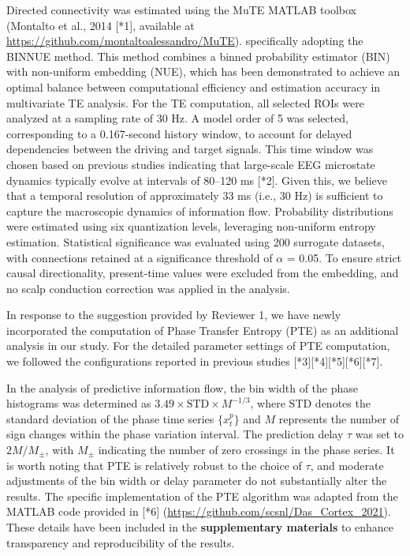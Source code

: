\documentclass[12pt,technote,onecolumn]{IEEEtran}
\begin{document}
Directed connectivity was estimated using the MuTE MATLAB toolbox (Montalto et al., 2014 [*1], available at \url{https://github.com/montaltoalessandro/MuTE}). specifically adopting the BINNUE method. This method combines a binned probability estimator (BIN) with non-uniform embedding (NUE), which has been demonstrated to achieve an optimal balance between computational efficiency and estimation accuracy in multivariate TE analysis. For the TE computation, all selected ROIs were analyzed at a sampling rate of 30 Hz. A model order of 5 was selected, corresponding to a 0.167-second history window, to account for delayed dependencies between the driving and target signals. This time window was chosen based on previous studies indicating that large-scale EEG microstate dynamics typically evolve at intervals of 80–120 ms [*2]. Given this, we believe that a temporal resolution of approximately 33 ms (i.e., 30 Hz) is sufficient to capture the macroscopic dynamics of information flow. Probability distributions were estimated using six quantization levels, leveraging non-uniform entropy estimation. Statistical significance was evaluated using 200 surrogate datasets, with connections retained at a significance threshold of  $\alpha$ = 0.05. To ensure strict causal directionality, present-time values were excluded from the embedding, and no scalp conduction correction was applied in the analysis.

In response to the suggestion provided by Reviewer 1, we have newly incorporated the computation of Phase Transfer Entropy (PTE) as an additional analysis in our study. For the detailed parameter settings of PTE computation, we followed the configurations reported in previous studies [*3][*4][*5][*6][*7]. 

In the analysis of predictive information flow, the bin width of the phase histograms was determined as $3.49 \times \mathrm{STD} \times M^{-1/3}$, where $\mathrm{STD}$ denotes the standard deviation of the phase time series $\{x_t^p\}$ and $M$ represents the number of sign changes within the phase variation interval. The prediction delay $\tau$ was set to $2M/M_\pm$, with $M_\pm$ indicating the number of zero crossings in the phase series. It is worth noting that PTE is relatively robust to the choice of $\tau$, and moderate adjustments of the bin width or delay parameter do not substantially alter the results. The specific implementation of the PTE algorithm was adapted from the MATLAB code provided in [*6] (\url{https://github.com/scsnl/Das_Cortex_2021}). These details have been included in the \textbf{supplementary materials} to enhance transparency and reproducibility of the results.
\end{document}
